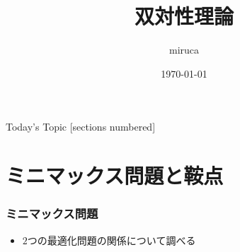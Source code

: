 \documentclass[dvipdfmx,11pt]{beamer}
\title{双対性理論}
\date{\today}
\author{miruca}
\institute{%
Graduate School of Informatics, Kyoto University
}
\begin{document}
\begin{frame}[plain]\frametitle{}
\titlepage %
\end{frame}
\begin{frame}{Today's Topic}%
  [sections numbered]
  \tableofcontents[hideallsubsections]
\end{frame}
\section{ミニマックス問題と鞍点}
\begin{frame}[t]\frametitle{ミニマックス問題}%
    \begin{itemize}
      \item $2$つの最適化問題の関係について調べる
    \end{itemize}
\end{frame}
\end{document}
